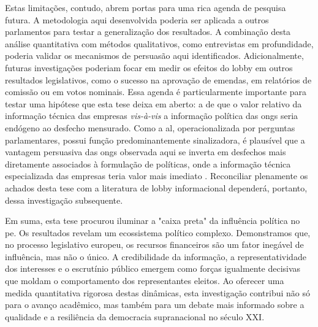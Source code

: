 Estas limitações, contudo, abrem portas para uma rica agenda de pesquisa futura. A metodologia aqui desenvolvida poderia ser aplicada a outros parlamentos para testar a generalização dos resultados. A combinação desta análise quantitativa com métodos qualitativos, como entrevistas em profundidade, poderia validar os mecanismos de persuasão aqui identificados. Adicionalmente, futuras investigações poderiam focar em medir os efeitos do lobby em outros resultados legislativos, como o sucesso na aprovação de emendas, em relatórios de comissão ou em votos nominais. Essa agenda é particularmente importante para testar uma hipótese que esta tese deixa em aberto: a de que o valor relativo da informação técnica das empresas \textit{vis-à-vis} a informação política das \acrshort{ong}s seria endógeno ao desfecho mensurado. Como a \acrshort{al}, operacionalizada por perguntas parlamentares, possui função predominantemente sinalizadora, é plausível que a vantagem persuasiva das \acrshort{ong}s observada aqui se inverta em desfechos mais diretamente associados à formulação de políticas, onde a informação técnica especializada das empresas teria valor mais imediato \cite{kluver_informational_2012, kluver2015legislative}. Reconciliar plenamente os achados desta tese com a literatura de lobby informacional dependerá, portanto, dessa investigação subsequente.

Em suma, esta tese procurou iluminar a "caixa preta" da influência política no \acrshort{pe}. Os resultados revelam um ecossistema político complexo. Demonstramos que, no processo legislativo europeu, os recursos financeiros são um fator inegável de influência, mas não o único. A credibilidade da informação, a representatividade dos interesses e o escrutínio público emergem como forças igualmente decisivas que moldam o comportamento dos representantes eleitos. Ao oferecer uma medida quantitativa rigorosa destas dinâmicas, esta investigação contribui não só para o avanço acadêmico, mas também para um debate mais informado sobre a qualidade e a resiliência da democracia supranacional no século XXI. 
